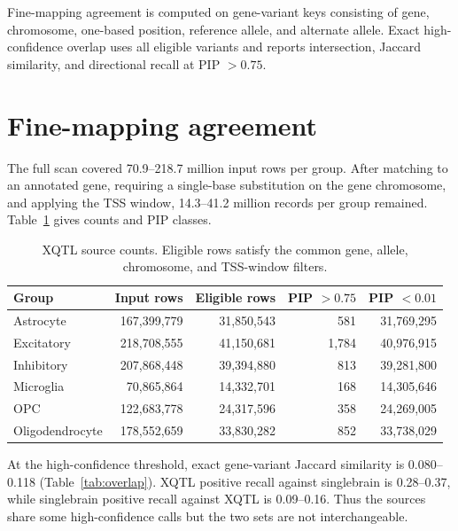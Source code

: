 \documentclass[11pt]{article}
\begin{document}
Fine-mapping agreement is computed on gene-variant keys consisting of gene,
chromosome, one-based position, reference allele, and alternate allele. Exact
high-confidence overlap uses all eligible variants and reports intersection,
Jaccard similarity, and directional recall at PIP $>0.75$.

\section{Fine-mapping agreement}
The full scan covered 70.9--218.7 million input rows per group. After
matching to an annotated gene, requiring a single-base substitution on the
gene chromosome, and applying the TSS window, 14.3--41.2 million records per
group remained. Table~\ref{tab:xqtl_counts} gives counts and PIP classes.

\begin{table}[ht]
\centering
\scriptsize
\caption{XQTL source counts. Eligible rows satisfy the common gene, allele,
chromosome, and TSS-window filters.}
\label{tab:xqtl_counts}
\begin{tabular}{@{}lrrrr@{}}
\toprule
Group & Input rows & Eligible rows & PIP $>0.75$ & PIP $<0.01$ \\
\midrule
Astrocyte & 167,399,779 & 31,850,543 & 581 & 31,769,295 \\
Excitatory & 218,708,555 & 41,150,681 & 1,784 & 40,976,915 \\
Inhibitory & 207,868,448 & 39,394,880 & 813 & 39,281,800 \\
Microglia & 70,865,864 & 14,332,701 & 168 & 14,305,646 \\
OPC & 122,683,778 & 24,317,596 & 358 & 24,269,005 \\
Oligodendrocyte & 178,552,659 & 33,830,282 & 852 & 33,738,029 \\
\bottomrule
\end{tabular}
\end{table}

At the high-confidence threshold, exact gene-variant Jaccard similarity is
0.080--0.118 (Table~\ref{tab:overlap}). XQTL positive recall against
singlebrain is 0.28--0.37, while singlebrain positive recall against XQTL is
0.09--0.16. Thus the sources share some high-confidence calls but the two
sets are not interchangeable.
\end{document}
